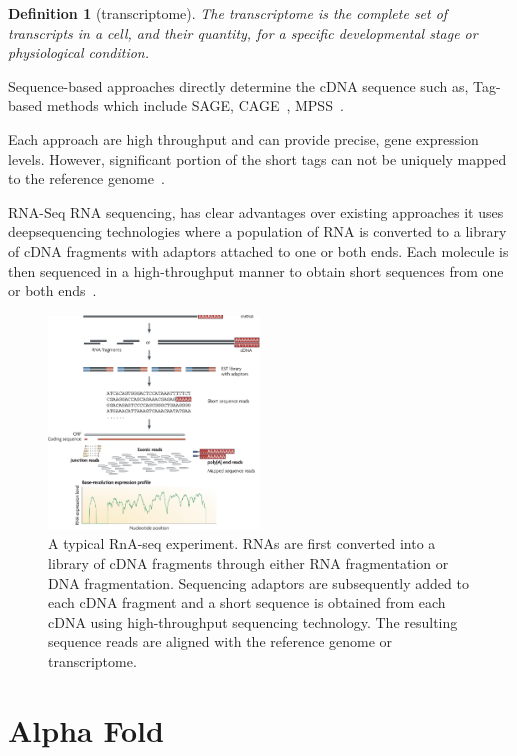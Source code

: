 \documentclass{report}
\newtheorem{definition}{Definition}[section]
\begin{document}
\begin{definition}[transcriptome]
    The transcriptome is the complete set of transcripts in a cell, and their quantity, for a specific developmental stage or physiological condition. 
\end{definition}

Sequence-based approaches directly determine the cDNA sequence such as, Tag-based methods which include SAGE, CAGE~\cite{kodzius_cage_2006}, MPSS~\cite{reinartz_massively_2002}.

Each approach are high throughput and can provide precise, gene expression levels. However, significant portion of the short tags can not be uniquely mapped to the reference genome~\cite{wang_rna-seq_2009}.

RNA-Seq RNA sequencing, has clear advantages over existing approaches it uses deepsequencing technologies where a population of RNA is converted to a library of cDNA fragments with adaptors attached to one or both ends. Each molecule is then sequenced in a high-throughput manner to obtain short sequences from one or both ends~\cite{wang_rna-seq_2009}.

\begin{figure}[H]
    \centering
    \includegraphics[width=0.5\textwidth]{RNAseq.png}
    \caption{\label{fig:RNAseq}A typical RnA-seq experiment. RNAs are first converted into a library of cDNA fragments through either RNA fragmentation or DNA fragmentation. Sequencing adaptors are subsequently added to each cDNA fragment and a short sequence is obtained from each cDNA using high-throughput sequencing technology. The resulting sequence reads are aligned with the reference genome or transcriptome.}
\end{figure}


\section{Alpha Fold}
\end{document}
